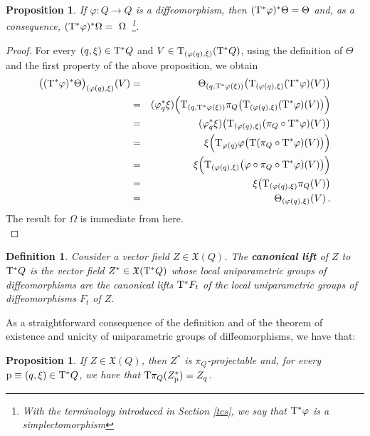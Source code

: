 \documentclass[12pt]{report}
\newtheorem{prop}[teor]{Proposition}
\newtheorem{definition}[teor]{Definition}
\def\beann{\begin{eqnarray*}}
\def\eeann{\end{eqnarray*}}
\def\qed{\ifvmode\removelastskip\fi
{\unskip\nobreak\hfil\penalty50\hbox{}\nobreak\hfil
\hbox{\vrule height1.2ex width1.2ex}\parfillskip=0pt
\finalhyphendemerits=0 \par\smallskip}}
\def\vf{\mathfrak X}
\def\Tan{{\rm T}}
\begin{document}
\begin{appendix}
\begin{prop}
If $\varphi\colon Q\to Q$ is a diffeomorphism,
then $(\Tan^*\varphi)^*\Theta =\Theta$ and,
as a consequence,
$(\Tan^*\varphi)^*\Omega =~\Omega$~\footnote{
With the terminology introduced in Section \ref{tcs},
we say that $\Tan^*\varphi$ is a {\sl simplectomorphism}}.
\label{levdif}
\end{prop}
\begin{proof}
For every $(q,\xi)\in\Tan^*Q$ and
$V\in\Tan_{(\varphi(q),\xi)}(\Tan^*Q)$,
using the definition of $\Theta$ and the first property of the above proposition, we obtain
\beann
\big((\Tan^*\varphi)^*\Theta\big)_{(\varphi(q),\xi)}(V) &=&
\Theta_{(q,\Tan^*\varphi(\xi))}\big(\Tan_{(\varphi(q),\xi)}(\Tan^*\varphi) (V)\big)
\\ &=&
(\varphi_q^*\xi)\Big(\Tan_{(q,\Tan^*\varphi(\xi))}\pi_Q \big(\Tan_{(\varphi(q),\xi)}(\Tan^*\varphi)(V)\big)\Big)
\\ &=&
(\varphi_q^*\xi)\big(\Tan_{(\varphi(q),\xi)}(\pi_Q\circ\Tan^*\varphi)(V)\big)\\
&=&
\xi\Big(\Tan_{\varphi(q)}\varphi\big(\Tan(\pi_Q\circ\Tan^*\varphi)(V)\big)\Big)
\\ &=&
\xi\Big(\Tan_{(\varphi(q),\xi)} \big(\varphi\circ\pi_Q\circ\Tan^*\varphi)(V)\big)\Big)\\
&=&\xi\big(\Tan_{(\varphi(q),\xi)}\pi_Q(V)\big)\\
&=&
\Theta_{(\varphi(q),\xi)}(V) \, .
\eeann
The result for $\Omega$ is immediate from here.
\\ \qed  \end{proof}

\begin{definition}
Consider a vector field $Z\in\vf (Q)$.
The \textbf{canonical lift} of $Z$ to $\Tan^*Q$
is the vector field $Z^*\in\vf (\Tan^*Q)$
whose local uniparametric groups of diffeomorphisms
are the canonical lifts $\Tan^* F_t$
of the local uniparametric groups of diffeomorphisms
$ F_t$ of $Z$.
\end{definition}

As a straightforward consequence of the definition and of the
theorem of existence and unicity of uniparametric groups
of diffeomorphisms, we have that:

\begin{prop}
If $Z\in\vf (Q)$, then $Z^*$ is $\pi_Q$-projectable and, 
for every ${\rm p}\equiv (q,\xi)\in\Tan^*Q$,
we have that $\Tan\pi_Q (Z^*_{\rm p})=Z_q$.
\label{prolevcan}
\end{prop}


\end{appendix}
\end{document}

